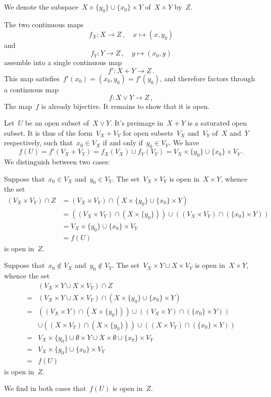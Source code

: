 \subsection{}

We denote the subspace~$X × \{ y_0 \} ∪ \{ x_0 \} × Y$ of~$X × Y$ by~$Z$.

The two continuous maps
\[
	f_X
	\colon
	X \to Z \,,
	\quad
	x \mapsto (x, y_0)
\]
and
\[
	f_Y
	\colon
	Y \to Z \,,
	\quad
	y \mapsto (x_0, y)
\]
assemble into a single continuous map
\[
	f' \colon X + Y \to Z \,.
\]
This map satisfies~$f'(x_0) = (x_0, y_0) = f'(y_0)$, and therefore factors through a continuous map
\[
	f \colon X ∨ Y \to Z \,,
\]
The map~$f$ is already bijective.
It remains to show that it is open.

Let~$U$ be an open subset of~$X ∨ Y$.
It’s preimage in~$X + Y$ is a saturated open subset.
It is thus of the form~$V_X + V_Y$ for open subsets~$V_X$ and~$V_Y$ of~$X$ and~$Y$ respectively, such that~$x_0 ∈ V_X$ if and only if~$y_0 ∈ V_Y$.
We have
\[
	f(U)
	=
	f'(V_X + V_Y)
	=
	f_X(V_X) ∪ f_Y(V_Y)
	=
	V_X × \{ y_0 \} ∪ \{ x_0 \} × V_Y \,.
\]
We distinguish between two cases:
\begin{casedistinction}

	\item
		Suppose that~$x_0 ∈ V_X$ and~$y_0 ∈ V_Y$.
		The set~$V_X × V_Y$ is open in~$X × Y$, whence the set
		\begin{align*}
			(V_X × V_Y) ∩ Z
			&=
			(V_X × V_Y) ∩ (X × \{ y_0 \} ∪ \{ x_0 \} × Y)
			\\
			&=
			((V_X × V_Y) ∩ (X × \{ y_0 \})) ∪ ((V_X × V_Y) ∩ (\{ x_0 \} × Y))
			\\
			&=
			V_X × \{ y_0 \} ∪ \{ x_0 \} × V_Y
			\\
			&=
			f(U)
		\end{align*}
		is open in~$Z$.

	\item
		Suppose that~$x_0 ∉ V_X$ and~$y_0 ∉ V_Y$.
		The set~$V_X × Y ∪ X × V_Y$ is open in~$X × Y$, whence the set
		\begin{align*}
			{}&
			(V_X × Y ∪ X × V_Y) ∩ Z
			\\
			={}&
			(V_X × Y ∪ X × V_Y) ∩ (X × \{ y_0 \} ∪ \{ x_0 \} × Y)
			\\
			={}&
			  ((V_X × Y) ∩ (X × \{ y_0 \}))
			∪ ((V_X × Y) ∩ (\{ x_0 \} × Y))
			\\
			{}&
			∪ ((X × V_Y) ∩ (X × \{ y_0 \}))
			∪ ((X × V_Y) ∩ (\{ x_0 \} × Y))
			\\
			={}&
			V_X × \{ y_0 \}
			∪ ∅ × Y
			∪ X × ∅
			∪ \{ x_0 \} × V_Y
			\\
			={}&
			V_X × \{ y_0 \} ∪ \{ x_0 \} × V_Y
			\\
			={}&
			f(U)
		\end{align*}
		is open in~$Z$.

\end{casedistinction}
We find in both cases that~$f(U)$ is open in~$Z$.
